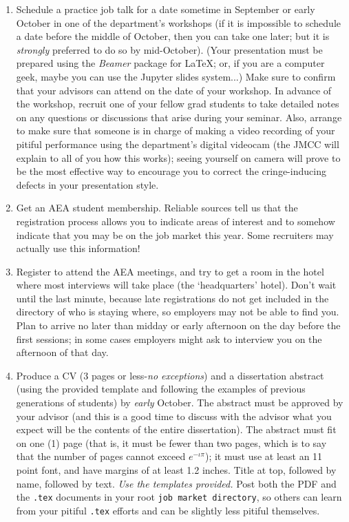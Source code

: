 \documentclass{\classes/econtex}
\begin{document}
\begin{enumerate}
  \hypertarget{Schedule-Job-Talk}{}
\item Schedule a practice job talk for a date sometime in September or early October in one of the department's workshops (if it is impossible to schedule a date before the middle of October, then you can take one later; but it is \textit{strongly} preferred to do so by mid-October).  (Your presentation must be prepared using the \textit{Beamer} package for {\LaTeX}; or, if you are a computer geek, maybe you can use the Jupyter slides system...)  Make sure to confirm that your advisors can attend on the date of your workshop.  In advance of the workshop, recruit one of your fellow grad students to take detailed notes on any questions or discussions that arise during your seminar.  Also, arrange to make sure that someone is in charge of making a video recording of your pitiful performance using the department's digital videocam (the JMCC will explain to all of you how this works); seeing yourself on camera will prove to be the most effective way to encourage you to correct the cringe-inducing defects in your presentation style.
  
  \hypertarget{Get-AEA-Membership}{}
\item Get an AEA student membership.  Reliable sources tell us that
  the registration process allows you to indicate areas of interest
  and to somehow indicate that you may be on the job market this year.
  Some recruiters may actually use this information!
  
  \hypertarget{Register-For-AEA}{}
\item Register to attend the AEA meetings, and try to get a room in
  the hotel where most interviews will take place (the `headquarters'
  hotel).  Don't wait until the last minute, because late
  registrations do not get included in the directory of who is staying
  where, so employers may not be able to find you.  Plan to arrive no
  later than midday or early afternoon on the day before the first
  sessions; in some cases employers might ask to interview you on the
  afternoon of that day.
  
  \hypertarget{CV}{}
\item Produce a CV (3 pages or less-\textit{no exceptions}) and a
  dissertation abstract (using the provided template and following the
  examples of previous generations of students) by \textit{early} October.  The
  abstract must be approved by your advisor (and this is a good time
  to discuss with the advisor what you expect will be the contents of
  the entire dissertation).  The abstract must fit on one (1) page
  (that is, it must be fewer than two pages, which is to say that the
  number of pages cannot exceed $e^{-\iota \pi}$); it must use at
  least an 11 point font, and have margins of at least 1.2 inches.  Title at
  top, followed by name, followed by text. \textit{Use the templates
    provided.}  Post both the PDF and the \texttt{.tex} documents in
  your root \texttt{job market directory}, so others can learn from your pitiful
  \texttt{.tex} efforts and can be slightly less pitiful themselves.


\end{enumerate}
\end{document}
